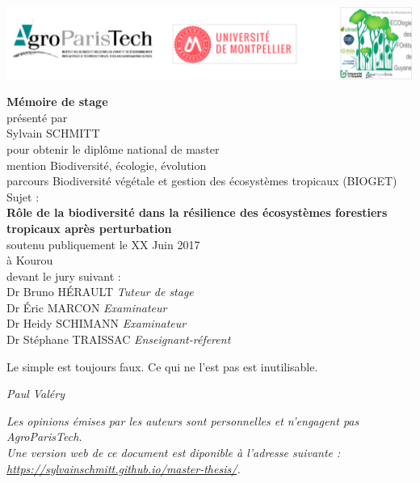 \includegraphics{images/logos}

\begin{center}
  \LARGE{\textbf{Mémoire de stage}} \\
  \vspace*{\fill}
  \large{présenté par} \\
  \large{Sylvain SCHMITT} \\
  \vspace*{\fill}
  \large{pour obtenir le diplôme national de master} \\
  \large{mention Biodiversité, écologie, évolution} \\
  \small{parcours Biodiversité végétale et gestion des écosystèmes tropicaux (BIOGET)} \\
  \vspace*{\fill}
  \large{Sujet :} \\
  \Large{\textbf{Rôle de la biodiversité dans la résilience des écosystèmes forestiers tropicaux après perturbation}} \\
  \vspace*{\fill}
  \large{soutenu publiquement le XX Juin 2017} \\
  \large{à Kourou} \\
  \vspace*{\fill}
  \large{devant le jury suivant :} \\
  \vspace*{\fill}
  Dr Bruno HÉRAULT  \emph{Tuteur de stage} \\
  Dr Éric MARCON  \emph{Examinateur} \\
  Dr Heidy SCHIMANN  \emph{Examinateur} \\
  Dr Stéphane TRAISSAC  \emph{Enseignant-réferent} \\
\end{center}

\newpage
\vspace*{\fill}
\epigraph{Le simple est toujours faux. Ce qui ne l'est pas est inutilisable.}{\textit{Paul Valéry}}
\vspace*{\fill}
\emph{Les opinions émises par les auteurs sont personnelles et n'engagent pas AgroParisTech.}\\
\emph{Une version web de ce document est diponible à l'adresse suivante : \url{https://sylvainschmitt.github.io/master-thesis/}.}
\newpage
